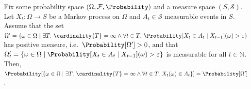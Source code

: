 \documentclass{article}
\newcommand{\Naturals}{\mathbb{N}}
\newcommand{\algostep}{\mathsf{t}}
\begin{document}
\begin{lemma} \label{stm:markov_process_repeating}
	Fix some probability space $(\Omega, \mathcal{F}, \Probability)$ and a measure space $(S, \mathcal{S})$.
	Let $X_t : \Omega \to S$ be a Markov process on $\Omega$ and $A_t \in \mathcal{S}$ measurable events in $S$.
	Assume that the set $\Omega' = \{\omega \in \Omega \mid \exists T.~\cardinality{T} = \infty \land \forall t \in T.~\Probability[X_t \in A_t \mid X_{t-1}](\omega) > \varepsilon\}$ has positive measure, i.e.\ $\Probability[\Omega'] > 0$, and that $\Omega'_t = \{\omega \in \Omega \mid \Probability[X_t \in A_t \mid X_{t-1}](\omega) > \varepsilon\}$ is measurable for all $t \in \Naturals$.
	Then, $\Probability[\{\omega \in \Omega \mid \exists T.~\cardinality{T} = \infty \land \forall t \in T.~X_\algostep(\omega) \in A_t\}] = \Probability[\Omega']$.
\end{lemma}
\end{document}
